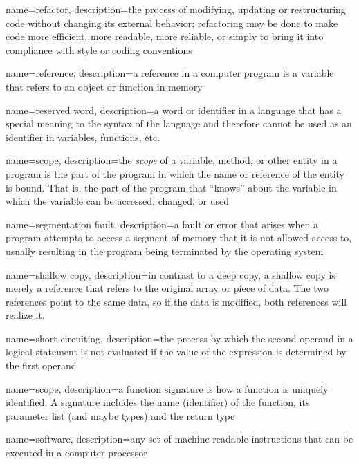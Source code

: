 {
  name=refactor,
  description={the process of modifying, updating or restructuring code without changing its external behavior; refactoring may be done to make code more efficient, more readable, more reliable, or simply to bring it into compliance with style or coding conventions}
}

{
  name=reference,
  description={a reference in a computer program is a variable that refers to an object or function in memory}
}

{
  name=reserved word,
  description={a word or identifier in a language that has a special meaning to the syntax of the language and 
  	therefore cannot be used as an identifier in variables, functions, etc.}
}

{
  name=scope,
  description={the \emph{scope} of a variable, method, or other entity in a program
  	is the part of the program in which the name or reference of the entity is bound.
	That is, the part of the program that ``knows'' about the variable in which the variable
	can be accessed, changed, or used}
}

{
  name=segmentation fault,
  description={a fault or error that arises when a program attempts to access a segment of memory that it is not allowed access to, usually resulting in the program being terminated by the operating system}
}

{
  name=shallow copy,
  description={in contrast to a deep copy, a shallow copy is merely a reference that refers to the original array or piece of data.  The two references point to the same data, so if the data is modified, both references will realize it.}
}

{
  name=short circuiting,
  description={the process by which the second operand in a logical statement is not evaluated if the
  	value of the expression is determined by the first operand}
}

{
  name=scope,
  description={a function signature is how a function is uniquely identified.  A signature includes the name (identifier) of the function, its parameter list (and maybe types) and the return type}
}

{
  name=software,
  description={any set of machine-readable instructions that can be executed in a computer processor}
}

